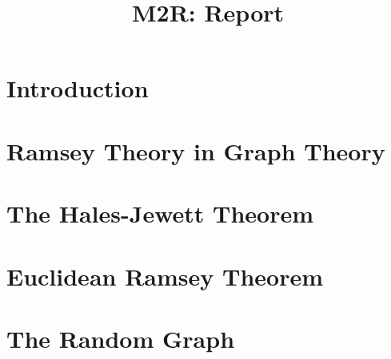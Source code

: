 \documentclass{article}
\title{M2R: Report}
\begin{document}
\maketitle

\section*{Introduction}
\label{sec:0}

\section{Ramsey Theory in Graph Theory}
\label{sec:1}

\section{The Hales-Jewett Theorem}
\label{sec:2}

\section{Euclidean Ramsey Theorem}
\label{sec:3}

\section{The Random Graph}
\label{sec:4}

\end{document}
